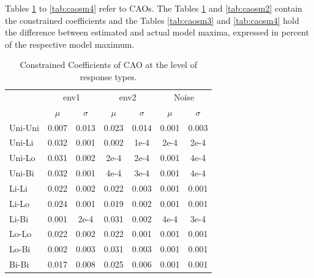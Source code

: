 		
		Tables \ref{tab:caosm1} to \ref{tab:caosm4} refer to CAOs.
		The Tables \ref{tab:caosm1} and \ref{tab:caosm2} contain the constrained coefficients and the Tables \ref{tab:caosm3} and \ref{tab:caosm4} hold the difference between estimated and actual model maxima, expressed in percent of the respective model maximum.
			
		\vspace{5em}
			
			\begin{table}[h!] 
				
				\normalsize
				\caption{Constrained Coefficients of CAO at the level of response types.}
				\centering
				
				\begin{tabular}{@{}lcccccc@{}}
					
					\toprule
					& \multicolumn{2}{c}{env1} & \multicolumn{2}{c}{env2} & \multicolumn{2}{c}{Noise}\\\cmidrule(l){2-3} \cmidrule(l){4-5} \cmidrule(l){6-7}
					& $\mu$ & $\sigma$ & $\mu$ & $\sigma$ & $\mu$ & $\sigma$\\
					\hline
					Uni-Uni & 0.007 & 0.013 & 0.023 & 0.014 & 0.001 & 0.003 \\
					Uni-Li  & 0.032 & 0.001 & 0.002 & 1e-4 & 2e-4 & 2e-4 \\
					Uni-Lo  & 0.031 & 0.002 & 2e-4  & 2e-4 & 0.001 & 4e-4 \\
					Uni-Bi  & 0.032 & 0.001 & 4e-4  & 3e-4 & 0.001 & 4e-4 \\
					Li-Li   & 0.022 & 0.002 & 0.022 & 0.003 & 0.001 & 0.001 \\
					Li-Lo   & 0.024 & 0.001 & 0.019 & 0.002 & 0.001 & 0.001 \\
					Li-Bi   & 0.001 & 2e-4  & 0.031 & 0.002 & 4e-4 & 3e-4 \\
					Lo-Lo   & 0.022 & 0.002 & 0.022 & 0.001 & 0.001 & 0.001 \\
					Lo-Bi   & 0.002 & 0.003 & 0.031 & 0.003 & 0.001 & 0.001 \\
					Bi-Bi   & 0.017 & 0.008 & 0.025 & 0.006 & 0.001 & 0.001 \\
					\toprule
					
				\end{tabular}
			
				\label{tab:caosm1}
			
			\end{table}
		
